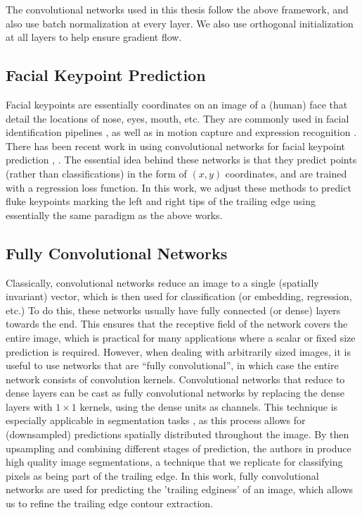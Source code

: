 The convolutional networks used in this thesis follow the above framework, and also use batch normalization \cite{ioffe2015batch} at every layer.
We also use orthogonal initialization \cite{saxe2013exact} at all layers to help ensure gradient flow.

\subsection{Facial Keypoint Prediction}

Facial keypoints are essentially coordinates on an image of a (human) face that detail the locations of nose, eyes, mouth, etc.
They are commonly used in facial identification pipelines \cite{taigman2014deepface}, as well as in motion capture \cite{akagi2013facial} and expression recognition \cite{berretti20113d}.
There has been recent work in using convolutional networks for facial keypoint prediction \cite{sun2013deep}, \cite{nouri2014using}. 
The essential idea behind these networks is that they predict points (rather than classifications) in the form of $(x, y)$ coordinates, and are trained with a regression loss function.
In this work, we adjust these methods to predict fluke keypoints marking the left and right tips of the trailing edge using essentially the same paradigm as the above works.

\subsection{Fully Convolutional Networks}

Classically, convolutional networks reduce an image to a single (spatially invariant) vector, which is then used for classification (or embedding, regression, etc.)
To do this, these networks usually have fully connected (or dense) layers towards the end.
This ensures that the receptive field of the network covers the entire image, which is practical for many applications where a scalar or fixed size prediction is required. 
However, when dealing with arbitrarily sized images, it is useful to use networks that are ``fully convolutional'', in which case the entire network consists of convolution kernels. 
Convolutional networks that reduce to dense layers can be cast as fully convolutional networks by replacing the dense layers with $1\times1$ kernels, using the dense units as channels.
This technique is especially applicable in segmentation tasks \cite{ning2005toward}, as this process allows for (downsampled) predictions spatially distributed throughout the image. %
By then upsampling and combining different stages of prediction, the authors in \cite{long2015fully} produce high quality image segmentations, a technique that we replicate for classifying pixels as being part of the trailing edge.
In this work, fully convolutional networks are used for predicting the 'trailing edginess' of an image, which allows us to refine the trailing edge contour extraction. 

